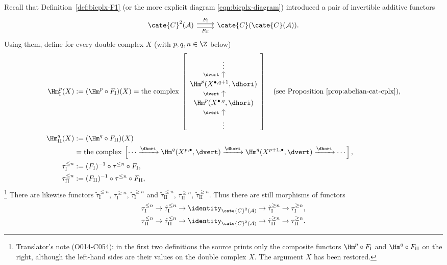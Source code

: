 Recall that Definition~\ref{def:bicplx-F1} (or the more explicit diagram
\eqref{eqn:bicplx-diagram}) introduced a pair of invertible additive functors
\[\begin{tikzcd}
	\cate{C}^2(\mathcal{A}) \arrow[r, shift left, "{F_{\mathrm{I}}}"] \arrow[r, shift right, "{F_{\mathrm{II}}}"'] & \cate{C}(\cate{C}(\mathcal{A})) .
\end{tikzcd}\]
Using them, define for every double complex $X$ (with $p,q,n\in\Z$ below)
\begin{align*}
	\Hm_{\mathrm{I}}^p(X) & := (\Hm^p \circ F_{\mathrm{I}})(X)
	= \text{the complex}\; \left[ \begin{tikzcd}[row sep=small]
		\vdots \\
		\Hm^p(X^{\bullet, q+1}, \dhori) \arrow[u, "{\dvert}" inner sep=0.6em] \\
		\Hm^p(X^{\bullet, q}, \dhori) \arrow[u, "{\dvert}" inner sep=0.6em] \\
		\vdots \arrow[u, "{\dvert}" inner sep=0.6em]
	\end{tikzcd}\right] \quad \text{(see Proposition~\ref{prop:abelian-cat-cplx})}, \\
	\Hm_{\mathrm{II}}^q(X) & := (\Hm^q \circ F_{\mathrm{II}})(X) \\
	& = \text{the complex}\; \left[ \cdots \xrightarrow{\dhori} \Hm^q(X^{p, \bullet}, \dvert) \xrightarrow{\dhori} \Hm^q(X^{p+1, \bullet}, \dvert) \xrightarrow{\dhori} \cdots \right] , \\
	\tau_{\mathrm{I}}^{\leq n} & := (F_{\mathrm{I}})^{-1} \circ \tau^{\leq n} \circ F_{\mathrm{I}}, \\
	\tau_{\mathrm{II}}^{\leq n} & := (F_{\mathrm{II}})^{-1} \circ \tau^{\leq n} \circ F_{\mathrm{II}},
\end{align*}  %
\footnote{Translator's note (O014-C054): in the first two definitions the
source prints only the composite functors $\Hm^p\circ F_{\mathrm{I}}$ and
$\Hm^q\circ F_{\mathrm{II}}$ on the right, although the left-hand sides are
their values on the double complex $X$. The argument $X$ has been restored.}
There are likewise functors $\tilde{\tau}_{\mathrm{I}}^{\leq n}$,
$\tau_{\mathrm{I}}^{\geq n}$, $\tilde{\tau}_{\mathrm{I}}^{\geq n}$ and
$\tilde{\tau}_{\mathrm{II}}^{\leq n}$,
$\tau_{\mathrm{II}}^{\geq n}$, $\tilde{\tau}_{\mathrm{II}}^{\geq n}$.
Thus there are still morphisms of functors
\begin{gather*}
	\tau_{\mathrm{I}}^{\leq n} \to \tilde{\tau}_{\mathrm{I}}^{\leq n} \to \identity_{\cate{C}^2(\mathcal{A})} \to \tilde{\tau}_{\mathrm{I}}^{\geq n} \to \tau_{\mathrm{I}}^{\geq n}, \\
	\tau_{\mathrm{II}}^{\leq n} \to \tilde{\tau}_{\mathrm{II}}^{\leq n} \to \identity_{\cate{C}^2(\mathcal{A})} \to \tilde{\tau}_{\mathrm{II}}^{\geq n} \to \tau_{\mathrm{II}}^{\geq n}.
\end{gather*}

